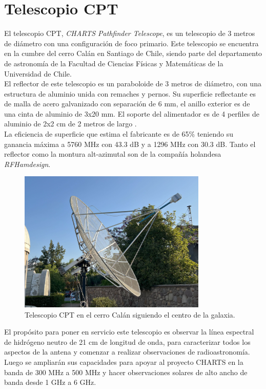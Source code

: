 \section{Telescopio CPT}

El telescopio CPT, \textit{CHARTS Pathfinder Telescope}, es un telescopio de 3 metros de diámetro con una configuración de foco primario. Este telescopio se encuentra en la cumbre del cerro Calán en Santiago de Chile, siendo parte del departamento de astronomía de la Facultad de Ciencias Físicas y Matemáticas de la Universidad de Chile.\\

El reflector de este telescopio es un paraboloide de 3 metros de diámetro, con una estructura de aluminio unida con remaches y pernos. Su superficie reflectante es de malla de acero galvanizado con separación de 6 mm, el anillo exterior es de una cinta de aluminio de 3x20 mm. El soporte del alimentador es de 4 perfiles de aluminio de 2x2 cm de 2 metros de largo \cite{rfhamdesign3meterdish}.\\

La eficiencia de superficie que estima el fabricante es de 65\% teniendo su ganancia máxima a 5760 MHz con 43.3 dB y a 1296 MHz con 30.3 dB. Tanto el reflector como la montura alt-azimutal son de la compañía holandesa \textit{RFHamdesign}.\\

\begin{figure}
    \centering
    \includegraphics[width = 0.8\textwidth]{img/cpt_tracking}
    \caption{Telescopio CPT en el cerro Calán siguiendo el centro de la galaxia.}
    \label{fig:cpt}
\end{figure}

El propósito para poner en servicio este telescopio es observar la línea espectral de hidrógeno neutro de 21 cm de longitud de onda, para caracterizar todos los aspectos de la antena y comenzar a realizar observaciones de radioastronomía. Luego se ampliarán sus capacidades para apoyar al proyecto CHARTS en la banda de 300 MHz a 500 MHz y hacer observaciones solares de alto ancho de banda desde 1 GHz a 6 GHz.\\

